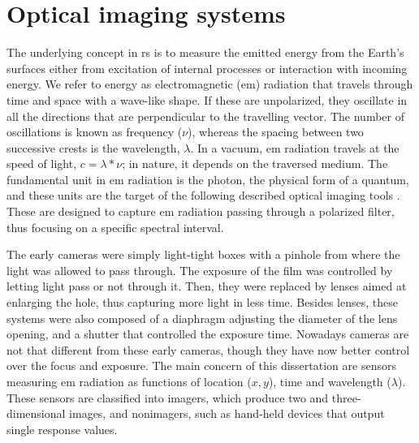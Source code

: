 \section{Optical imaging systems} 

The underlying concept in \acrshort{rs} is to measure the emitted energy from the Earth's surfaces either from excitation of internal processes or interaction with incoming energy. We refer to energy as electromagnetic (\acrshort{em}) radiation that travels through time and space with a wave-like shape. If these are unpolarized, they oscillate in all the directions that are perpendicular to the travelling vector. The number of oscillations is known as frequency ($\nu$), whereas the spacing between two successive crests is the wavelength, $\lambda$. In a vacuum, \acrshort{em} radiation travels at the speed of light, $c = \lambda * \nu$; in nature, it depends on the traversed medium. The fundamental unit in \acrshort{em} radiation is the photon, the physical form of a quantum, and these units are the target of the following described optical imaging tools \cite{emery_introduction_2017}. These are designed to capture \acrshort{em} radiation passing through a polarized filter, thus focusing on a specific spectral interval.

The early cameras were simply light-tight boxes with a pinhole from where the light was allowed to pass through. The exposure of the film was controlled by letting light pass or not through it. Then, they were replaced by lenses aimed at enlarging the hole, thus capturing more light in less time. Besides lenses, these systems were also composed of a diaphragm adjusting the diameter of the lens opening, and a shutter that controlled the exposure time. Nowadays cameras are not that different from these early cameras, though they have now better control over the focus and exposure. The main concern of this dissertation are sensors measuring \acrshort{em} radiation as functions of location ($x, y$), time and wavelength ($\lambda$). These sensors are classified into imagers, which produce two and three-dimensional images, and nonimagers, such as hand-held devices that output single response values. 

